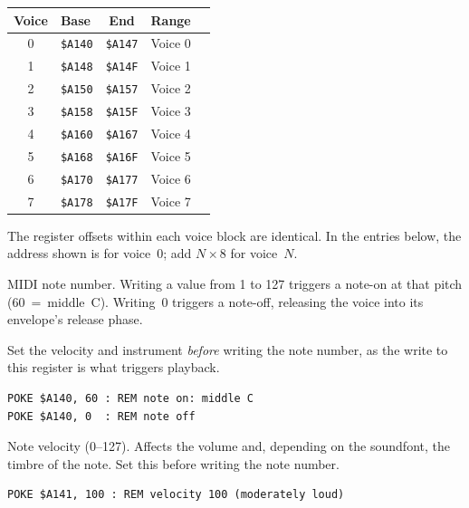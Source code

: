 \begin{center}
\small
\begin{tabular}{@{}clcll@{}}
\toprule
\textbf{Voice} & \textbf{Base} & \textbf{End} & \textbf{Range} \\
\midrule
0 & \texttt{\$A140} & \texttt{\$A147} & Voice 0 \\
1 & \texttt{\$A148} & \texttt{\$A14F} & Voice 1 \\
2 & \texttt{\$A150} & \texttt{\$A157} & Voice 2 \\
3 & \texttt{\$A158} & \texttt{\$A15F} & Voice 3 \\
4 & \texttt{\$A160} & \texttt{\$A167} & Voice 4 \\
5 & \texttt{\$A168} & \texttt{\$A16F} & Voice 5 \\
6 & \texttt{\$A170} & \texttt{\$A177} & Voice 6 \\
7 & \texttt{\$A178} & \texttt{\$A17F} & Voice 7 \\
\bottomrule
\end{tabular}
\end{center}

The register offsets within each voice block are identical.  In the entries
below, the address shown is for voice~0; add $N \times 8$ for voice~$N$.



MIDI note number.  Writing a value from 1 to 127 triggers a note-on at that
pitch (60~=~middle~C).  Writing~0 triggers a note-off, releasing the voice into
its envelope's release phase.

Set the velocity and instrument \emph{before} writing the note number, as the
write to this register is what triggers playback.

\begin{lstlisting}
POKE $A140, 60 : REM note on: middle C
POKE $A140, 0  : REM note off
\end{lstlisting}



Note velocity (0--127).  Affects the volume and, depending on the soundfont,
the timbre of the note.  Set this before writing the note number.

\begin{lstlisting}
POKE $A141, 100 : REM velocity 100 (moderately loud)
\end{lstlisting}

